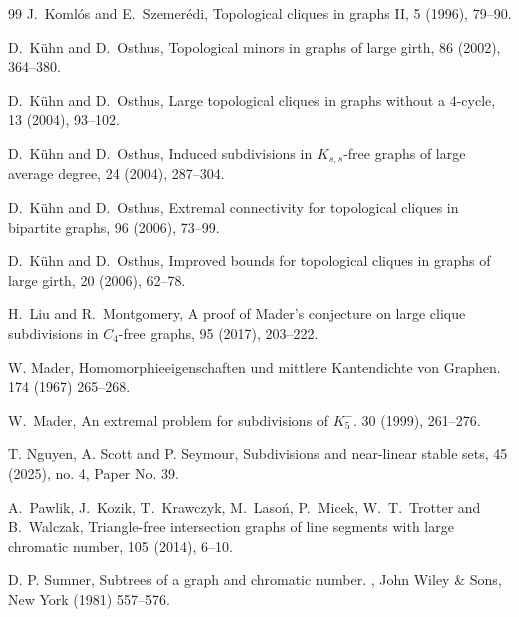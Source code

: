 \documentclass[10pt, a4paper]{article}
\numberwithin{theorem}{section} %
\theoremstyle{remark}
\theoremstyle{definition}
\begin{document}
\begin{thebibliography}{99}
J.~Koml\'os and E.~Szemer\'edi,
\newblock Topological cliques in graphs {II},
 5 (1996), 79--90.

D.~K\"uhn and D.~Osthus,
\newblock Topological minors in graphs of large girth,
 86 (2002), 364--380.

D.~K\"uhn and D.~Osthus,
\newblock Large topological cliques in graphs without a $4$-cycle,
 13 (2004), 93--102.

D.~K\"uhn and D.~Osthus,
\newblock Induced subdivisions in $K_{s,s}$-free graphs of large average degree,
 24 (2004), 287--304.

D.~K\"uhn and D.~Osthus,
\newblock Extremal connectivity for topological cliques in bipartite graphs,
 96 (2006), 73--99.

D.~K\"uhn and D.~Osthus,
\newblock Improved bounds for topological cliques in graphs of large girth,
 20 (2006), 62--78.

H.~Liu and R.~Montgomery,
\newblock A proof of Mader's conjecture on large clique subdivisions in $C_4$-free graphs,
 95 (2017), 203--222.

W. Mader, 
\newblock Homomorphieeigenschaften und mittlere Kantendichte von Graphen. 
 174 (1967) 265--268.

W.~Mader,
\newblock An extremal problem for subdivisions of $K_5^-$. 
 30 (1999), 261--276.

T. Nguyen, A. Scott and P. Seymour,
\newblock Subdivisions and near-linear stable sets,
 45 (2025), no. 4, Paper No. 39.

A.~Pawlik, J.~Kozik, T.~Krawczyk, M.~Laso\'n, P.~Micek, W.~T.~Trotter and B.~Walczak,
\newblock Triangle-free intersection graphs of line segments with large chromatic number,
 105 (2014), 6--10.

D. P. Sumner, 
\newblock Subtrees of a graph and chromatic number. 
, John Wiley \& Sons, New York (1981) 557--576.

\end{thebibliography}
\end{document}
